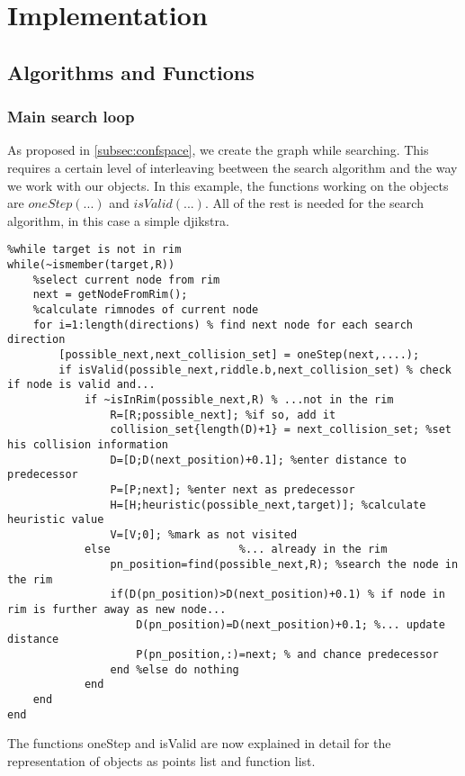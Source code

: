 \chapter{Implementation}
\label{cha:Implementation}

\section{Algorithms and Functions}

\subsection{Main search loop}
As proposed in \ref{subsec:confspace}, we create the graph while searching. This requires a certain level of interleaving beetween the search algorithm and the way we work with our objects. In this example, the functions working on the objects are $oneStep(...)$ and $isValid(...)$. All of the rest is needed for the search algorithm, in this case a simple djikstra.
\lstset{language=Matlab}
\begin{lstlisting}
%while target is not in rim
while(~ismember(target,R))
    %select current node from rim
    next = getNodeFromRim();  
    %calculate rimnodes of current node 
    for i=1:length(directions) % find next node for each search direction
        [possible_next,next_collision_set] = oneStep(next,....); 
        if isValid(possible_next,riddle.b,next_collision_set) % check if node is valid and...
            if ~isInRim(possible_next,R) % ...not in the rim
                R=[R;possible_next]; %if so, add it
                collision_set{length(D)+1} = next_collision_set; %set his collision information
                D=[D;D(next_position)+0.1]; %enter distance to predecessor
                P=[P;next]; %enter next as predecessor
                H=[H;heuristic(possible_next,target)]; %calculate heuristic value
                V=[V;0]; %mark as not visited
            else                    %... already in the rim
                pn_position=find(possible_next,R); %search the node in the rim
                if(D(pn_position)>D(next_position)+0.1) % if node in rim is further away as new node...
                    D(pn_position)=D(next_position)+0.1; %... update distance
                    P(pn_position,:)=next; % and chance predecessor
                end %else do nothing
            end
    end  
end
\end{lstlisting}

The functions oneStep and isValid are now explained in detail for the representation of objects as points list and function list.

